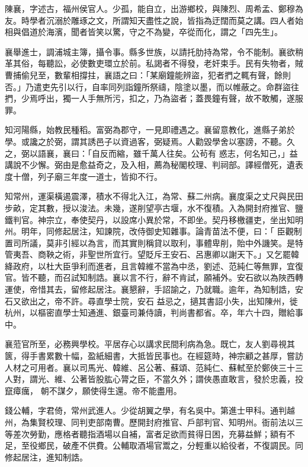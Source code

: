 \begin{pinyinscope}
 陳襄，字述古，福州侯官人。少孤，能自立，出游鄉校，與陳烈、周希孟、鄭穆為友。時學者沉溺於雕琢之文，所謂知天盡性之說，皆指為迂闊而莫之講。四人者始相與倡道於海濱，聞者皆笑以驚，守之不為變，卒從而化，謂之「四先生」。



 襄舉進士，調浦城主簿，攝令事。縣多世族，以請托肋持為常，令不能制。襄欲稍革其俗，每聽訟，必使數吏環立於前。私謁者不得發，老奸束手。民有失物者，賊
 曹捕偷兒至，數輩相撐拄，襄語之曰：「某廟鐘能辨盜，犯者捫之輒有聲，餘則否。」乃遣吏先引以行，自率同列詣鐘所祭禱，陰塗以墨，而以帷蔽之。命群盜往捫，少焉呼出，獨一人手無所污，扣之，乃為盜者；蓋畏鐘有聲，故不敢觸，遂服罪。



 知河陽縣，始教民種稻。富弼為郡守，一見即禮遇之。襄留意教化，進縣子弟於學。或讒之於弼，謂其誘邑子以資過客，弼疑焉。人勸毀學舍以塞謗，不聽。久之，弼以語襄，襄曰：「自反而縮，雖千萬人往矣。公茍有
 惑志，何名知己，」益講說不少懈。弼由是愈益奇之，及入相，薦為秘閣校理、判祠部。譯經僧死，遺表度十僧，列子廟三年度一道士，皆抑不行。



 知常州，運渠橫遏震澤，積水不得北入江，為常、蘇二州病。襄度渠之丈尺與民田步畝，定其數，授以浚法。未幾，遂削望亭古堰，水不復積。入為開封府推官、鹽鐵判官。神宗立，奉使契丹，以設席小異於常，不即坐。契丹移檄疆吏，坐出知明州。明年，同修起居注，知諫院，改侍御史知雜事。論青苗法不便，曰：「
 臣觀制置司所議，莫非引經以為言，而其實則稱貸以取利，事體卑削，貽中外譏笑。是特管夷吾、商鞅之術，非聖世所宜行。望貶斥王安石、呂惠卿以謝天下。」又乞罷韓絳政府，以杜大臣爭利而進者，且言韓維不當為中丞，劉述、范純仁等無罪，宜復官。皆不聽，而召試知制誥。襄以言不行，辭不肯試，願補外。安石欲以為陜西轉運使，帝惜其去，留修起居注。襄懇辭，手詔諭之，乃就職。逾年，為知制誥，安石又欲出之，帝不許。尋直學士院，安石
 益忌之，擿其書詔小失，出知陳州，徙杭州，以樞密直學士知通進、銀臺司兼侍讀，判尚書都省。卒，年六十四，贈給事中。



 襄蒞官所至，必務興學校。平居存心以講求民間利病為急。既亡，友人劉尋視其篋，得手書累數十幅，盈紙細書，大抵皆民事也。在經筵時，神宗顧之甚厚，嘗訪人材之可用者。襄以司馬光、韓維、呂公著、蘇頌、范純仁、蘇軾至於鄭俠三十三人對，謂光、維、公著皆股肱心膂之臣，不當久外；謂俠愚直敢言，發於忠義，投竄瘴癘，
 朝不謀夕，願使得生還。帝不能盡用。



 錢公輔，字君倚，常州武進人。少從胡翼之學，有名吳中。第進士甲科。通判越州，為集賢校理、同判吏部南曹。歷開封府推官、戶部判官、知明州。衙前法以三等差次勞勤，應格者聽指酒場以自補，富者足欲而貧得日困，充募益鮮；額有不足，至役鄉民，破產不供費。公輔取酒場官鬻之，分輕重以給役者，不復調民。同修起居注，進知制誥。




\end{pinyinscope}
